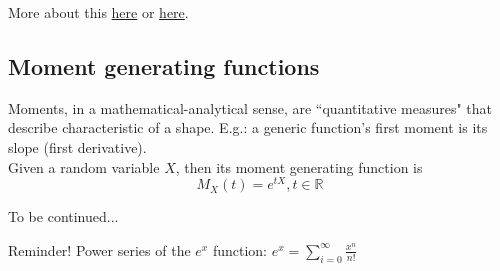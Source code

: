 	More about this \href{https://youtu.be/vjYanZ1nsZg}{here} or \href{https://ocw.mit.edu/resources/res-6-012-introduction-to-probability-spring-2018/part-i-the-fundamentals/}{here}.


\subsection{Moment generating functions}
	
	Moments, in a mathematical-analytical sense, are ``quantitative measures" that describe characteristic of a shape. E.g.: a generic function's first moment is its slope (first derivative).\\
	Given a random variable $X$, then its moment generating function is
	\begin{equation}
	M_X(t) = e^{tX}, t \in \mathbb{R}
	\end{equation}
	
	To be continued... %
	
	Reminder! Power series of the $e^x$ function: $\displaystyle e^x = \sum_{i=0}^{\infty}\frac{x^n}{n!}$

